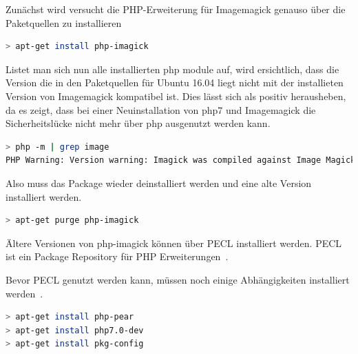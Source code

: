 
Zunächst wird versucht die PHP-Erweiterung für Imagemagick genauso über die Paketquellen zu installieren

\begin{lstlisting}[language=Bash, caption=Install PHP-Imagick Modul,label={lst:installphpmagick}]
> apt-get install php-imagick
\end{lstlisting}
\vspace{5mm}


Listet man sich nun alle installierten php module auf, wird ersichtlich, dass die Version die in den Paketquellen für Ubuntu 16.04 liegt nicht mit der installieten Version von Imagemagick kompatibel ist.
Dies lässt sich als positiv herausheben, da es zeigt, dass bei einer Neuinstallation von php7 und Imagemagick die Sicherheitslücke nicht mehr über php ausgenutzt werden kann.

\begin{lstlisting}[language=Bash, caption=PHP Module überprüfen,label={lst:checkmodule}]
> php -m | grep image
PHP Warning: Version warning: Imagick was compiled against Image Magick version 1673 but version 1682 is loaded. Imagick will run but may behave surprisingly in Unknown on line 0
\end{lstlisting}
\vspace{5mm}

Also muss das Package wieder deinstalliert werden und eine alte Version installiert werden.

\begin{lstlisting}[language=Bash, caption=Uninstall PHP-Imagick Modul,label={lst:uninstallimagick}]
> apt-get purge php-imagick
\end{lstlisting}
\vspace{5mm}

\newpage
{}

Ältere Versionen von php-imagick können über PECL installiert werden.
PECL ist ein Package Repository für PHP Erweiterungen~\cite{PHPPecl}.

Bevor PECL genutzt werden kann, müssen noch einige Abhängigkeiten installiert werden~\cite{InstallPECLExtensions}.
\begin{lstlisting}[language=Bash, caption=Installiere PECL Abhängigkeiten,label={lst:installpecldeps}]
> apt-get install php-pear
> apt-get install php7.0-dev
> apt-get install pkg-config
\end{lstlisting}
\vspace{5mm}

